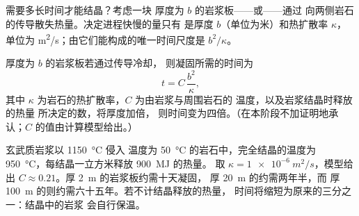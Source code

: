 需要多长时间才能结晶？考虑一块
厚度为 $b$ 的岩浆板——或——通过
向两侧岩石的传导散失热量。决定进程快慢的量只有
是厚度 $b$（单位为米）和热扩散率 $\kappa$，
单位为 \unit{m^2/s}；由它们能构成的唯一时间尺度是 $b^2/\kappa$。

\begin{proposition}[岩浆板的冷却时间]\label{prop:g11:igneous-rocks:cooling}
厚度为 $b$ 的岩浆板若通过传导冷却，
则凝固所需的时间为
\[
  t = C\,\frac{b^2}{\kappa},
\]
其中 $\kappa$ 为岩石的热扩散率，$C$ 为由岩浆与周围岩石的
温度，以及岩浆结晶时释放的热量
所决定的数，将厚度加倍，
则时间变为四倍。（在本阶段不加证明地承认；$C$ 的值由计算模型给出。）
\end{proposition}

玄武质岩浆以 \qty{1150}{\degreeCelsius} 侵入
温度为 \qty{50}{\degreeCelsius} 的岩石中，完全结晶的温度为
\qty{950}{\degreeCelsius}，每结晶一立方米释放 \qty{900}{MJ} 的热量。
取 $\kappa = \qty{1e-6}{m^2/s}$，模型给出
$C \approx 0.21$。厚 \qty{2}{m} 的岩浆板约需十天凝固，
厚 \qty{20}{m} 的约需两年半，而
厚 \qty{100}{m} 的则约需六十五年。若不计结晶释放的热量，
时间将缩短为原来的三分之一：结晶中的岩浆
会自行保温。


